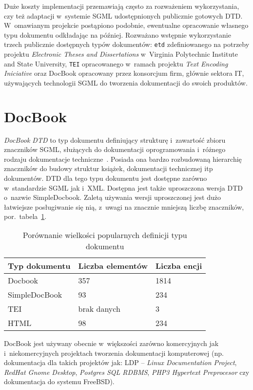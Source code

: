 \documentclass[brudnopis]{xmgr}
\begin{document}
Duże koszty implementacji przemawiają często za rozważeniem
wykorzystania, czy też adaptacji w~systemie SGML udostępnionych
publicznie gotowych DTD. W~omawianym projekcie postąpiono podobnie,
ewentualne opracowanie własnego typu dokumentu odkładając na później.
Rozważano wstępnie wykorzystanie trzech publicznie dostępnych typów
dokumentów: \texttt{etd} zdefiniowanego na potrzeby projektu
\textit{Electronic Theses and Dissertations} w~Virginia Polytechnic
Institute and State University, \texttt{TEI} opracowanego w~ramach
projektu \textit{Text Encoding Iniciative} oraz
DocBook opracowany przez konsorcjum firm, głównie sektora IT,
używających technologii SGML do tworzenia dokumentacji do swoich
produktów.

\section{DocBook}
\emph{DocBook DTD} to typ dokumentu definiujący
strukturę i~zawartość zbioru znaczników SGML, służących do
dokumentacji oprogramowania i~różnego rodzaju dokumentacje
techniczne~\cite[s.~123]{Elmasri:2002:CMC}. Posiada ona bardzo rozbudowaną
hierarchię znaczników do budowy struktur książek, dokumentacji
technicznej itp dokumentów.  DTD dla tego typu dokumentu jest dostępne
zarówno w~standardzie SGML jak i~XML. Dostępna jest także uproszczona
wersja DTD o~nazwie SimpleDocbook. Zaletą używania wersji uproszczonej
jest dużo łatwiejsze posługiwanie się nią, z~uwagi na znacznie
mniejszą liczbę znaczników, por.~tabela~\ref{tab:dtd-cmp}.

\begin{table}[!tbh]
\begin{tabular}{|l|l|l|} \hline
Typ dokumentu & Liczba elementów & Liczba encji \\ \hline
Docbook & 357 & 1814 \\ \hline
SimpleDocBook  & 93  & 234 \\ \hline
TEI & brak danych & 3 \\ \hline
HTML & 98  & 234 \\ \hline
\end{tabular}
\caption{Porównanie wielkości popularnych definicji
  typu dokumentu\label{tab:dtd-cmp}}
\end{table}

DocBook jest używany obecnie w~większości zarówno komercyjnych jak
i~niekomercyjnych projektach tworzenia dokumentacji komputerowej
(np. dokumentacja dla takich projektów jak: LDP -- \textit{Linux
Documentation Project}, \textit{RedHat Gnome Desktop},
\textit{Postgres SQL RDBMS}, \textit{PHP3 Hypertext Preprocesor} czy
dokumentacja do systemu FreeBSD).
\end{document}
